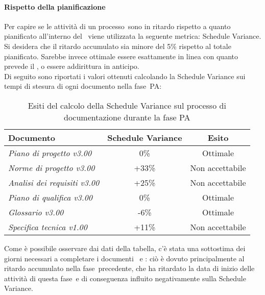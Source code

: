 \documentclass[../PianoDiQualifica.tex]{subfiles}
\begin{document}
\begin{appendices}
			\paragraph{Rispetto della pianificazione}
			Per capire se le attività di un processo\g\ sono in ritardo rispetto a quanto pianificato all'interno del \pianodiprogetto\ viene utilizzata la seguente metrica: Schedule Variance.\\
			Si desidera che il ritardo accumulato sia minore del 5\% rispetto al totale pianificato. Sarebbe invece ottimale essere esattamente in linea con quanto prevede il \pianodiprogetto, o essere addirittura in anticipo.\\
			Di seguito sono riportati i valori ottenuti calcolando la Schedule Variance sui tempi di stesura di ogni documento nella fase\g\ PA:
			\begin{table}[H]
				\centering
				\begin{tabular}{l * {2}{c}}
					\toprule
					\textbf{Documento} & \textbf{Schedule Variance} & \textbf{Esito} \\
					\midrule
					\textit{Piano di progetto v3.00} & 0\% &  Ottimale \\
					\textit{Norme di progetto v3.00} & +33\% & Non accettabile \\
					\textit{Analisi dei requisiti v3.00} & +25\% & Non accettabile \\
					\textit{Piano di qualifica v3.00} & 0\% & Ottimale \\
					\textit{Glossario v3.00} & -6\% & Ottimale \\
					\textit{Specifica tecnica v1.00} & +11\% & Non accettabile \\
					\bottomrule
				\end{tabular}
				\caption{Esiti del calcolo della Schedule Variance sul processo di documentazione durante la fase PA}
				\label{tab:esiti_schedule_variance}
			\end{table}
			Come è possibile osservare dai dati della tabella, c'è stata una sottostima dei giorni necessari a completare i documenti \normediprogetto\ e \analisideirequisiti: ciò è dovuto principalmente al ritardo accumulato nella fase\g\ precedente, che ha ritardato la data di inizio delle attività di questa fase\g\ e di conseguenza influito negativamente sulla Schedule Variance.
			

\end{appendices}
\end{document}
